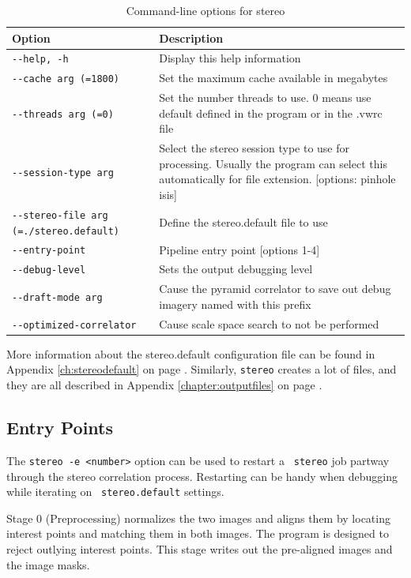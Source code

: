 \begin{longtable}{|l|p{10cm}|}
\caption{Command-line options for stereo}
\label{tbl:stereo}
\endfirsthead
\endhead
\endfoot
\endlastfoot
\hline
Option & Description \\ \hline \hline
\verb#--help, -h# & Display this help information\\ \hline
\verb#--cache arg (=1800)# & Set the maximum cache available in megabytes\\ \hline
\verb#--threads arg (=0)# & Set the number threads to use. 0 means use default defined in the program or in the .vwrc file\\ \hline
\verb#--session-type arg# & Select the stereo session type to use for processing. Usually the program can select this automatically for file extension. [options: pinhole isis]\\ \hline
\verb#--stereo-file arg (=./stereo.default)# & Define the stereo.default file to use\\ \hline
\verb#--entry-point# & Pipeline entry point [options 1-4]\\ \hline
\verb#--debug-level# & Sets the output debugging level\\ \hline
\verb#--draft-mode arg# & Cause the pyramid correlator to save out debug imagery named with this prefix\\ \hline
\verb#--optimized-correlator# & Cause scale space search to not be performed\\ \hline
\end{longtable}

More information about the stereo.default configuration file can be found in Appendix \ref{ch:stereodefault} on page \pageref{ch:stereodefault}.  Similarly, \texttt{stereo} creates a lot of files, and they are all described in Appendix \ref{chapter:outputfiles} on page \pageref{chapter:outputfiles}.

\subsection{Entry Points}
\label{entrypoints}

The {\tt stereo -e <number>} option can be used to restart a {\tt
  stereo} job partway through the stereo correlation process.
Restarting can be handy when debugging while iterating on {\tt
  stereo.default} settings.

Stage 0 (Preprocessing) normalizes the two images and aligns them
by locating interest points and matching them in both images. The
program is designed to reject outlying interest points.  This stage
writes out the pre-aligned images and the image masks.

